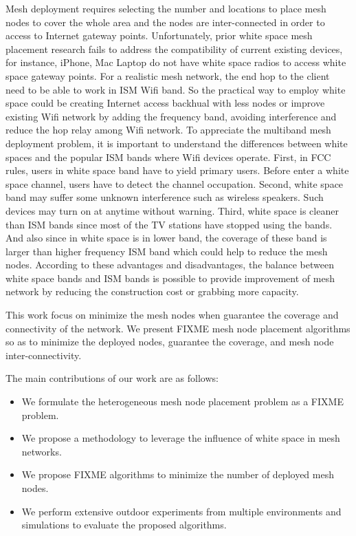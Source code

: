 Mesh deployment requires selecting the number and locations to place mesh nodes to cover the whole area and the nodes are inter-connected in order to access to Internet gateway points.
Unfortunately, prior white space mesh placement research fails to address the compatibility of current existing devices, for instance, iPhone, Mac Laptop do not have white space radios to access white space gateway points. For a realistic mesh network, the end hop to the client need to be able to work in ISM Wifi band. 
So the practical way to employ white space could be creating Internet access backhual with less nodes or improve existing Wifi network by adding the frequency band, avoiding interference and reduce the hop relay among Wifi network.
To appreciate the multiband mesh deployment problem, it is important to understand the differences between white spaces and the popular ISM bands where Wifi devices operate. First, in FCC rules, users in white space band have to yield primary users.
Before enter a white space channel, users have to detect the channel occupation. 
Second, white space band may suffer some unknown interference such as wireless speakers. Such devices may turn on at anytime without warning. 
Third, white space is cleaner than ISM bands since most of the TV stations have stopped using the bands. 
And also since in white space is in lower band, the coverage of these band is larger than higher frequency ISM band which could help to reduce the mesh nodes. 
According to these advantages and disadvantages, the balance between white space bands and ISM bands is possible to provide improvement of mesh network by reducing the construction cost or grabbing more capacity. 



This work focus on minimize the mesh nodes when guarantee the coverage and connectivity of the network.
We present FIXME mesh node placement algorithms so as to minimize the deployed nodes, guarantee the coverage, and mesh node inter-connectivity.


% 

% 
The main contributions of our work are as follows:
\begin{itemize}
\item We formulate the heterogeneous mesh node placement problem as a FIXME problem.  

\item We propose a methodology to leverage the influence of white space in mesh networks.

\item We propose FIXME algorithms to minimize the number of deployed mesh nodes.

\item We perform extensive outdoor experiments from multiple environments and simulations to evaluate the proposed algorithms.


\end{itemize}




